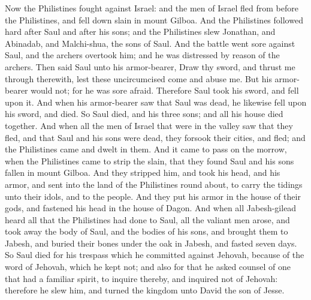 Now the Philistines fought against Israel: and the men of Israel fled from before the Philistines, and fell down slain in mount Gilboa. And the Philistines followed hard after Saul and after his sons; and the Philistines slew Jonathan, and Abinadab, and Malchi-shua, the sons of Saul. And the battle went sore against Saul, and the archers overtook him; and he was distressed by reason of the archers. Then said Saul unto his armor-bearer, Draw thy sword, and thrust me through therewith, lest these uncircumcised come and abuse me. But his armor-bearer would not; for he was sore afraid. Therefore Saul took his sword, and fell upon it. And when his armor-bearer saw that Saul was dead, he likewise fell upon his sword, and died. So Saul died, and his three sons; and all his house died together.  And when all the men of Israel that were in the valley saw that they fled, and that Saul and his sons were dead, they forsook their cities, and fled; and the Philistines came and dwelt in them. And it came to pass on the morrow, when the Philistines came to strip the slain, that they found Saul and his sons fallen in mount Gilboa. And they stripped him, and took his head, and his armor, and sent into the land of the Philistines round about, to carry the tidings unto their idols, and to the people. And they put his armor in the house of their gods, and fastened his head in the house of Dagon. And when all Jabesh-gilead heard all that the Philistines had done to Saul, all the valiant men arose, and took away the body of Saul, and the bodies of his sons, and brought them to Jabesh, and buried their bones under the oak in Jabesh, and fasted seven days.  So Saul died for his trespass which he committed against Jehovah, because of the word of Jehovah, which he kept not; and also for that he asked counsel of one that had a familiar spirit, to inquire thereby, and inquired not of Jehovah: therefore he slew him, and turned the kingdom unto David the son of Jesse. 

